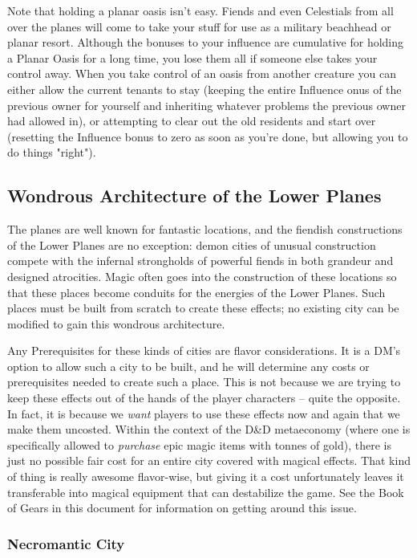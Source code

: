 Note that holding a planar oasis isn't easy. Fiends and even Celestials from all over the planes will come to take your stuff for use as a military beachhead or planar resort. Although the bonuses to your influence are cumulative for holding a Planar Oasis for a long time, you lose them all if someone else takes your control away. When you take control of an oasis from another creature you can either allow the current tenants to stay (keeping the entire Influence onus of the previous owner for yourself and inheriting whatever problems the previous owner had allowed in), or attempting to clear out the old residents and start over (resetting the Influence bonus to zero as soon as you're done, but allowing you to do things "right").

\subsection{Wondrous Architecture of the Lower Planes}

The planes are well known for fantastic locations, and the fiendish constructions of the Lower Planes are no exception: demon cities of unusual construction compete with the infernal strongholds of powerful fiends in both grandeur and designed atrocities. Magic often goes into the construction of these locations so that these places become conduits for the energies of the Lower Planes. Such places must be built from scratch to create these effects; no existing city can be modified to gain this wondrous architecture.

Any Prerequisites for these kinds of cities are flavor considerations. It is a DM's option to allow such a city to be built, and he will determine any costs or prerequisites needed to create such a place. This is not because we are trying to keep these effects out of the hands of the player characters -- quite the opposite. In fact, it is because we \textit{want} players to use these effects now and again that we make them uncosted. Within the context of the D\&D metaeconomy (where one is specifically allowed to \textit{purchase} epic magic items with tonnes of gold), there is just no possible fair cost for an entire city covered with magical effects. That kind of thing is really awesome flavor-wise, but giving it a cost unfortunately leaves it transferable into magical equipment that can destabilize the game. See the Book of Gears in this document for information on getting around this issue.

\subsubsection{Necromantic City}

